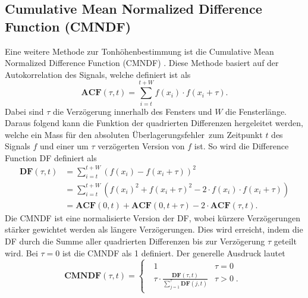 \subsection{Cumulative Mean Normalized Difference Function (CMNDF)
\label{autotune:subsection:cumultativeMeanNormalizedDifferenceFunction}}
Eine weitere Methode zur Tonhöhenbestimmung ist die Cumulative Mean Normalized Difference Function (CMNDF) \cite{autotune:f0EstimationForTheElectricGuitar}.
%
%
Diese Methode basiert auf der Autokorrelation des Signals, welche definiert ist als
%
\begin{equation}
    \mathbf{ACF}(\tau, t)
    =
    \sum_{i=t}^{t+W}f(x_i)\cdot f(x_i+\tau).
\end{equation}
Dabei sind $\tau$ die Verzögerung innerhalb des Fensters und $W$ die Fensterlänge.
Daraus folgend kann die Funktion der quadrierten Differenzen hergeleitet werden,
welche ein Mass für den absoluten \glqq Überlagerungsfehler\grqq\ zum Zeitpunkt $t$ des Signals $f$ und einer um $\tau$ verzögerten Version von $f$ ist.
So wird die Difference Function DF definiert als
\begin{equation}
    \begin{aligned}
        \mathbf{DF}(\tau,t)
        &= \sum_{i=t}^{t+W}\left(f(x_i)-f(x_i+\tau)\right)^2 \\
        &= \sum_{i=t}^{t+W}\left(f(x_i)^2+f(x_i+\tau)^2-2 \cdot f(x_i) \cdot f(x_i + \tau)\right) \\
        &= \mathbf{ACF}(0,t)+\mathbf{ACF}(0,t+\tau)-2\cdot \mathbf{ACF}(\tau,t).
    \end{aligned}
\end{equation}
Die CMNDF ist eine normalisierte Version der DF,
wobei kürzere Verzögerungen stärker gewichtet werden als längere Verzögerungen.
Dies wird erreicht, indem die DF durch die Summe aller quadrierten Differenzen bis zur Verzögerung $\tau$ geteilt wird.
Bei $\tau=0$ ist die CMNDF als 1 definiert.
Der generelle Ausdruck lautet
\begin{equation}
    \mathbf{CMNDF}(\tau,t)
    =
    \begin{cases}
        \;\begin{array}{ll} 1 & \tau=0 \\
        \tau \cdot \frac{\mathbf{DF}(\tau,t)}{\sum\nolimits_{j=1}^{\tau} \mathbf{DF}(j,t)} & \tau > 0\;. \end{array}
        \end{cases}
\end{equation}
